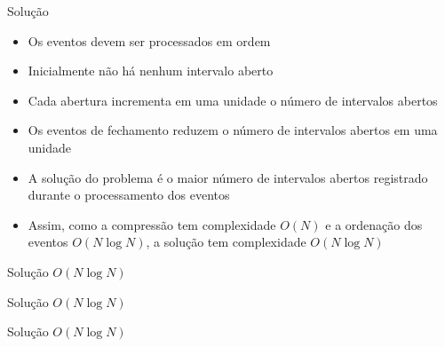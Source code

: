 \begin{frame}[fragile]{Solução}

    \begin{itemize}
        \item Os eventos devem ser processados em ordem

        \item Inicialmente não há nenhum intervalo aberto

        \item Cada abertura incrementa em uma unidade o número de intervalos abertos

        \item Os eventos de fechamento reduzem o número de intervalos abertos em uma unidade

        \item A solução do problema é o maior número de intervalos abertos registrado durante
            o processamento dos eventos

        \item Assim, como a compressão tem complexidade $O(N)$ e a ordenação dos eventos
            $O(N\log N)$, a solução tem complexidade $O(N\log N)$
    \end{itemize}

\end{frame}
\begin{frame}[fragile]{Solução $O(N\log N)$}
\end{frame}

\begin{frame}[fragile]{Solução $O(N\log N)$}
\end{frame}

\begin{frame}[fragile]{Solução $O(N\log N)$}
\end{frame}

